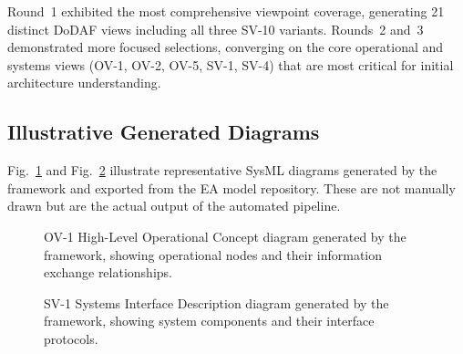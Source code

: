\documentclass{ieeeaccess}
\begin{document}
Round~1 exhibited the most comprehensive viewpoint coverage, generating 21 distinct DoDAF views including all three SV-10 variants. Rounds~2 and~3 demonstrated more focused selections, converging on the core operational and systems views (OV-1, OV-2, OV-5, SV-1, SV-4) that are most critical for initial architecture understanding.

\subsection{Illustrative Generated Diagrams}

Fig.~\ref{fig:ov1} and Fig.~\ref{fig:sv1} illustrate representative SysML diagrams generated by the framework and exported from the EA model repository. These are not manually drawn but are the actual output of the automated pipeline.

\begin{figure}[t]
\centering
{}
\caption{OV-1 High-Level Operational Concept diagram generated by the framework, showing operational nodes and their information exchange relationships.}
\label{fig:ov1}
\end{figure}

\begin{figure}[t]
\centering
{}
\caption{SV-1 Systems Interface Description diagram generated by the framework, showing system components and their interface protocols.}
\label{fig:sv1}
\end{figure}
\end{document}
